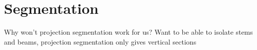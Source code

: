 \section{Segmentation}

Why won't projection segmentation work for us? Want to be able to isolate stems and beams, projection segmentation only gives vertical sections
